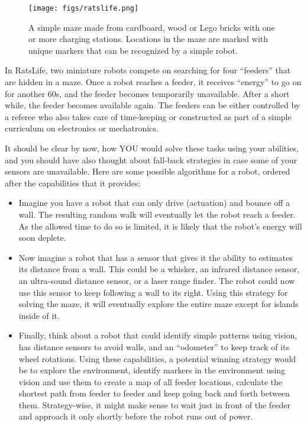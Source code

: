 \begin{figure}
	\centering
		\texttt{[image: figs/ratslife.png]}
	\caption{A simple maze made from cardboard, wood or Lego bricks with one or more charging stations. Locations in the maze are marked with unique markers that can be recognized by a simple robot.}
	\label{fig:ratslife}
\end{figure}



In RatsLife, two miniature robots  compete on searching for four ``feeders'' that are hidden in  a maze. Once a robot reaches a feeder, it receives ``energy'' to go on for another 60s, and the feeder becomes temporarily unavailable. After a short while, the feeder becomes available again. The feeders can be either controlled by a referee who also takes care of time-keeping or constructed as part of a simple curriculum on electronics or mechatronics.

It should be clear by now, how YOU would solve these tasks using your abilities, and you should have also thought about fall-back strategies in case some of your sensors are unavailable. Here are some possible algorithms for a robot, ordered after the capabilities that it provides:
\begin{itemize}
\item Imagine you have a robot that can only drive (actuation) and bounce off a wall. The resulting random walk will eventually let the robot reach a feeder. As the allowed time to do so is limited, it is likely that the robot's energy will soon deplete.
\item Now imagine a robot that has a sensor that gives it the ability to estimates its distance from a wall. This could be a whisker, an infrared distance sensor, an ultra-sound distance sensor, or a laser range finder. The robot could now use this sensor to keep following a wall to its right. Using this strategy for solving the maze, it will eventually explore the entire maze except for islands inside of it.
\item Finally, think about a robot that could identify simple patterns using vision, has distance sensors to avoid walls, and an ``odometer'' to keep track of its wheel rotations. Using these capabilities, a potential winning strategy would be to explore the environment, identify markers in the environment using vision and use them to create a map of all feeder locations, calculate the shortest path from feeder to feeder and keep going back and forth between them. Strategy-wise, it might make sense to wait just in front of the feeder and approach it only shortly before the robot runs out of power.
\end{itemize}

